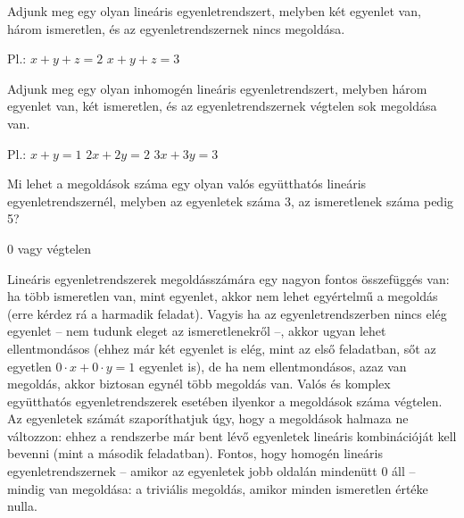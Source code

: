 \begin{frame}
  \begin{tcolorbox}[title={5/1. {\symknight}}]
      Adjunk meg egy olyan lineáris egyenletrendszert, melyben két egyenlet van, három ismeretlen, és az egyenletrendszernek nincs megoldása.
  \tcblower

    \mmedskip 
    
    Pl.:
$x + y + z = 2$
$x + y + z = 3$
  \end{tcolorbox}
\end{frame}


\begin{frame}
  \begin{tcolorbox}[title={5/2. {\symknight}}]
      Adjunk meg egy olyan inhomogén lineáris egyenletrendszert, melyben három egyenlet van, két ismeretlen, és az egyenletrendszernek végtelen sok megoldása van.
  \tcblower

    \mmedskip 
    
    Pl.:
$x + y = 1$
$2x + 2y = 2$
$3x + 3y = 3$

  \end{tcolorbox}
\end{frame}


\begin{frame}
  \begin{tcolorbox}[title={5/3. {\symknight}}]
      Mi lehet a megoldások száma egy olyan valós együtthatós lineáris egyenletrendszernél, melyben az egyenletek száma 3, az ismeretlenek száma pedig 5?
  \tcblower

    \mmedskip 
    
    0 vagy végtelen
  \end{tcolorbox}
\end{frame}


\begin{frame}
  \begin{tcolorbox}[title={5/3. {\symknight}}]
Lineáris egyenletrendszerek megoldásszámára egy nagyon fontos összefüggés van: ha több ismeretlen van, mint egyenlet, akkor nem lehet egyértelmű a megoldás (erre kérdez rá a harmadik feladat). Vagyis ha az egyenletrendszerben nincs elég egyenlet – nem tudunk eleget az ismeretlenekről –, akkor ugyan lehet ellentmondásos (ehhez már két egyenlet is elég, mint az első feladatban, sőt az egyetlen $0 \cdot x + 0 \cdot y = 1$ egyenlet is), de ha nem ellentmondásos, azaz van megoldás, akkor biztosan egynél több megoldás van. Valós és komplex együtthatós egyenletrendszerek esetében ilyenkor a megoldások száma végtelen. Az egyenletek számát szaporíthatjuk úgy, hogy a megoldások halmaza ne változzon: ehhez a rendszerbe már bent lévő egyenletek lineáris kombinációját kell bevenni (mint a második feladatban). Fontos, hogy homogén lineáris egyenletrendszernek – amikor az egyenletek jobb oldalán mindenütt 0 áll – mindig van megoldása: a triviális megoldás, amikor minden ismeretlen értéke nulla.
  \end{tcolorbox}
\end{frame}



